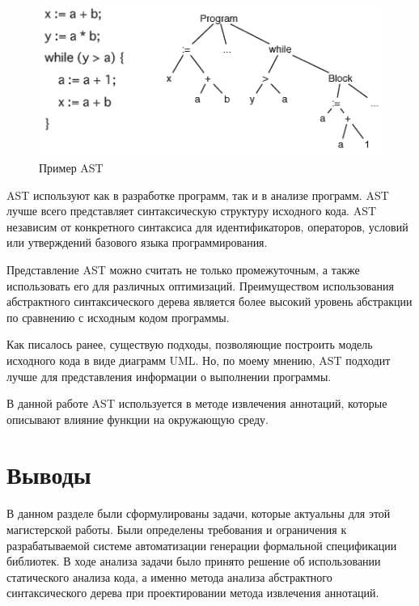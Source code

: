 \begin{figure}[htbp]
\centering
\includegraphics[width=\textwidth]{fig/ast_example_1.png}
\caption{Пример AST}%
\label{fig:ast_example_1}
\end{figure}

AST используют как в разработке программ, так и в анализе программ.
AST лучше всего представляет синтаксическую структуру исходного кода. AST независим от конкретного синтаксиса для идентификаторов, операторов, условий или утверждений базового языка программирования.

Представление AST можно считать не только промежуточным, а также использовать его для различных оптимизаций. Преимуществом использования абстрактного синтаксического дерева является более высокий уровень абстракции по сравнению с исходным кодом программы.

Как писалось ранее, существую подходы, позволяющие построить модель исходного кода в виде диаграмм UML. Но, по моему мнению, AST подходит лучше для представления информации о выполнении программы.

В данной работе AST используется в методе извлечения аннотаций, которые описывают влияние функции на окружающую среду.

\section{Выводы}

В данном разделе были сформулированы задачи, которые актуальны для этой магистерской работы. Были определены требования и ограничения к разрабатываемой системе автоматизации генерации формальной спецификации библиотек.
В ходе анализа задачи было принято решение об использовании статического анализа кода, а именно метода анализа абстрактного синтаксического дерева при проектировании метода извлечения аннотаций.